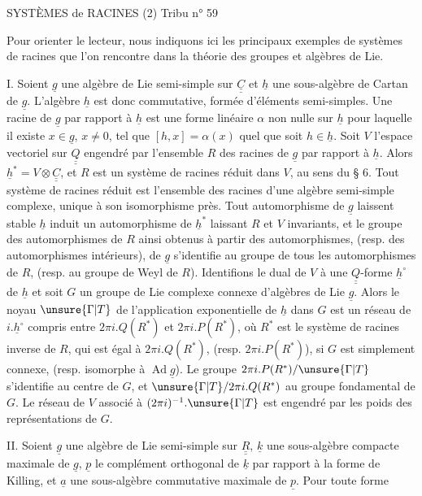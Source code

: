 SYSTÈMES de RACINES (2) \hfill Tribu n° 59

Pour orienter le lecteur, nous indiquons ici les principaux exemples de
systèmes de racines que l'on rencontre dans la théorie des groupes et algèbres
de Lie.

I. Soient $\underline{g}$ une algèbre de Lie semi-simple sur $\underline{\underline{C}}$ et $\underline{h}$ une sous-algèbre de
Cartan de $\underline{g}$. L'algèbre $\underline{h}$ est donc commutative, formée d'éléments semi-simples.
Une racine de $\underline{g}$ par rapport à $\underline{h}$ est une forme linéaire $\alpha$ non nulle sur $\underline{h}$ pour
laquelle il existe $x\in\underline{g}$, $x\ne0$, tel que $[h,x]=\alpha(x)$ quel que soit $h\in\underline{h}$.
Soit $V$ l'espace vectoriel sur $\underline{\underline{Q}}$ engendré par l'ensemble $R$ des racines de $\underline{g}$ par
rapport à $\underline{h}$. Alors $\underline{h}^{*}=V\otimes\underline{\underline{C}}$, et $R$ est un système de racines réduit dans $V$,
au sens du § 6. Tout système de racines réduit est l'ensemble des racines d'une
algèbre semi-simple complexe, unique à son isomorphisme près. Tout automorphisme
de $\underline{g}$ laissent stable $\underline{h}$ induit un automorphisme de $\underline{h}^{*}$ laissant $R$ et $V$ invariants,
et le groupe des automorphismes de $R$ ainsi obtenus à partir des automorphismes,
(resp. des automorphismes intérieurs), de $\underline{g}$ s'identifie au groupe de tous les
automorphismes de $R$, (resp. au groupe de Weyl de $R$). Identifions le dual de $V$ à
une $\underline{\underline{Q}}$-forme $\underline{h}^{\circ}$ de $\underline{h}$ et soit $G$ un groupe de Lie complexe connexe d'algèbres de
Lie $\underline{g}$. Alors le noyau $\unsure{\Gamma|T}$ de l'application exponentielle de $\underline{h}$ dans $G$ est un réseau
de $i.\underline{h}^{\circ}$ compris entre $2\pi i.Q(R^{*})$ et $2\pi i.P(R^{*})$, où $R^{*}$ est le système de racines
inverse de $R$, qui est égal à $2\pi i.Q(R^{*})$, (resp. $2\pi i.P(R^{*})$), si $G$ est simplement
connexe, (resp. isomorphe à $\operatorname{Ad}\underline{g}$). Le groupe $2\pi i.P(R^{*})/\unsure{\Gamma|T}$ s'identifie au centre
de $G$, et $\unsure{\Gamma|T}/2\pi i.Q(R^{*})$ au groupe fondamental de $G$. Le réseau de $V$ associé à
$(2\pi i)^{-1}.\unsure{\Gamma|T}$ est engendré par les poids des représentations de $G$.

II. Soient $\underline{g}$ une algèbre de Lie semi-simple sur $\underline{\underline{R}}$, $\underline{k}$ une sous-algèbre compacte
maximale de $\underline{g}$, $\underline{p}$ le complément orthogonal de $\underline{k}$ par rapport à la forme de
Killing, et $\underline{a}$ une sous-algèbre commutative maximale de $\underline{p}$. Pour toute forme
